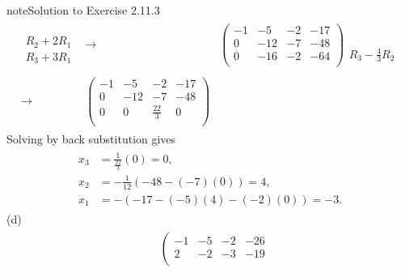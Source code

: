 \documentclass[letterpaper,10pt,english]{jupyterBook}
\begin{document}
\begin{sphinxadmonition}{note}{Solution to Exercise 2.11.3}
\begin{equation*}
\begin{split}
\begin{align*}
    \begin{array}{l} \phantom{x} \\ R_{2} + 2 R_{1}\\ R_{3} + 3 R_{1}\end{array} & 
    \longrightarrow 
    & \left( \begin{array}{ccc|c} 
         -1 & -5 & -2 & -17 \\ 
         0 & -12 & -7 & -48 \\ 
         0 & -16 & -2 & -64 \\ 
    \end{array} \right) 
    \begin{array}{l} \phantom{x} \\ \phantom{x} \\ R_{3} - \frac{4}{3} R_{2} \end{array} \\ \\ 
    \longrightarrow 
    & \left( \begin{array}{ccc|c} 
         -1 & -5 & -2 & -17 \\ 
         0 & -12 & -7 & -48 \\ 
         0 & 0 & \frac{22}{3} & 0 \\ 
    \end{array} \right) 
\end{align*} \end{split}
\end{equation*}
\sphinxAtStartPar
Solving by back substitution gives
\begin{equation*}
\begin{split} \begin{align*} 
    x_{3} &=  \frac{1}{\frac{22}{3}} \left( 0 \right) = 0, \\ 
    x_{2} &=  - \frac{1}{12} \left( -48 - \left( -7 \right) \left( 0 \right) \right) = 4, \\ 
    x_{1} &=  - \left( -17 - \left( -5 \right) \left( 4 \right) - \left( -2 \right) \left( 0 \right) \right) = -3. 
\end{align*} \end{split}
\end{equation*}
\sphinxAtStartPar
(d)
\begin{equation*}
\begin{split} \begin{align*} 
    & \left( \begin{array}{ccc|c} 
         -1 & -5 & -2 & -26 \\ 
         2 & -2 & -3 & -19 \\ 

\end{array}
\end{align*}
\end{split}
\end{equation*}
\end{sphinxadmonition}
\end{document}
